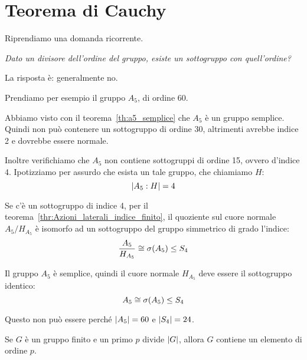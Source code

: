 \chapter{Teorema di Cauchy}
\label{ch:teorema_cauchy}

Riprendiamo una domanda ricorrente.

\emph{Dato un divisore dell'ordine del gruppo, esiste un sottogruppo con quell'ordine?}

La risposta è: generalmente no.

Prendiamo per esempio il gruppo $A_5$, di ordine 60.

Abbiamo visto con il teorema~\ref{th:a5_semplice} che $A_5$ è un gruppo semplice.
Quindi non può contenere un sottogruppo di ordine 30, altrimenti avrebbe indice 2 e dovrebbe essere normale.

Inoltre verifichiamo che $A_5$ non contiene sottogruppi di ordine 15, ovvero d'indice 4.
Ipotizziamo per assurdo che esista un tale gruppo, che chiamiamo $H$:
\begin{equation*}
    \lvert A_5:H \rvert = 4
\end{equation*}

Se c'è un sottogruppo di indice 4, per il teorema~\ref{thr:Azioni_laterali_indice_finito}, il quoziente sul
cuore normale $A_5/H_{A_5}$ è isomorfo ad un sottogruppo del gruppo simmetrico di grado l'indice:
\begin{equation*}
    \dfrac{A_5}{H_{A_5}} \cong \sigma(A_5) \le S_4
\end{equation*}

Il gruppo $A_5$ è semplice, quindi il cuore normale $H_{A_5}$ deve essere il sottogruppo identico:
\begin{equation*}
    A_5 \cong \sigma(A_5) \le S_4
\end{equation*}

Questo non può essere perché $\lvert A_5 \rvert = 60$ e $\lvert S_4 \rvert = 24$.

\begin{teorema}
    \label{thr:cauchy}
    Se $G$ è un gruppo finito e un primo $p$ divide $\lvert G \rvert$, allora $G$ contiene un elemento di ordine $p$.
\end{teorema}

